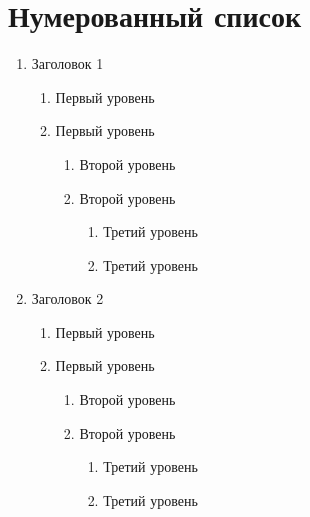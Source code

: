 \documentclass[a4paper,12pt]{article}
\begin{document}
\section{Нумерованный список}
\begin{enumerate}
    \item Заголовок 1
          \begin{enumerate}
              \item Первый уровень
              \item Первый уровень
                    \begin{enumerate}
                        \item Второй уровень
                        \item Второй уровень
                              \begin{enumerate}
                                  \item Третий уровень
                                  \item Третий уровень
                              \end{enumerate}
                    \end{enumerate}
          \end{enumerate}
    \item Заголовок 2
          \begin{enumerate}
              \item Первый уровень
              \item Первый уровень
                    \begin{enumerate}
                        \item Второй уровень
                        \item Второй уровень
                              \begin{enumerate}
                                  \item Третий уровень
                                  \item Третий уровень
                              \end{enumerate}
                    \end{enumerate}
          \end{enumerate}
\end{enumerate}
\end{document}
